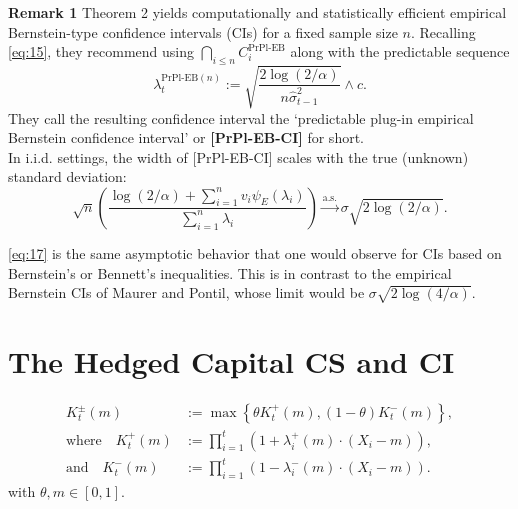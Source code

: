 \documentclass{article}
\renewcommand{\leq}{\leqslant}
\begin{document}
\noindent \textbf{Remark 1} Theorem 2 yields computationally and statistically efficient empirical Bernstein-type confidence intervals (CIs) for a fixed sample size \( n \). Recalling \eqref{eq:15}, they recommend using \( \bigcap_{i \leq n} C_i^{\text{PrPl-EB}} \) along with the predictable sequence  
\begin{equation} \label{eq:16}
    \lambda_t^{\text{PrPl-EB}(n)} := 
    \sqrt{\frac{2 \log(2/\alpha)}{n \hat{\sigma}^2_{t-1}}} \wedge c.
\end{equation}
They call the resulting confidence interval the ‘predictable plug-in empirical Bernstein confidence interval’ or \textbf{[PrPl-EB-CI]} for short. \\

\noindent In i.i.d. settings, the width of [PrPl-EB-CI] scales with the true (unknown) standard deviation:  
\begin{equation} \label{eq:17}
    \sqrt{n} \left( \frac{{\log (2/\alpha) + \sum_{i=1}^{n} v_i \psi_E(\lambda_i)}}{\sum_{i=1}^{n} \lambda_i} \right)
    \xrightarrow{\text{a.s.}} 
    \sigma \sqrt{2 \log (2/\alpha)}.
\end{equation}

\noindent \eqref{eq:17} is the same asymptotic behavior that one would observe for CIs based on
Bernstein’s or Bennett’s inequalities. This is in contrast to the empirical Bernstein CIs of Maurer and
Pontil, whose limit would be \( \sigma \sqrt{2 \log (4/\alpha)}\).

\section{The Hedged Capital CS and CI}
\setcounter{equation}{23}
\begin{equation} \label{eq:24}
\begin{aligned}
    K^\pm_t (m) &:= \max \left\{ \theta K^+_t (m), (1 - \theta) K^-_t (m) \right\}, \\
    \text{where} \quad K^+_t (m) &:= \prod_{i=1}^{t} \left( 1 + \lambda^+_i (m) \cdot (X_i - m) \right), \\
    \text{and} \quad K^-_t (m) &:= \prod_{i=1}^{t} \left( 1 - \lambda^-_i (m) \cdot (X_i - m) \right).
\end{aligned}
\end{equation}
with \( \theta, m \in [0,1] \).
\end{document}
